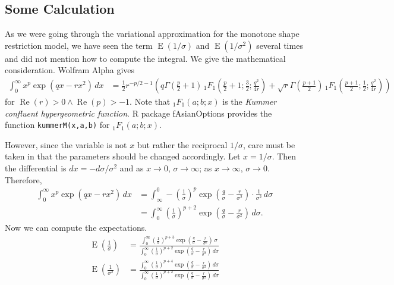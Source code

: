 \documentclass[11pt]{article}
\newcommand{\opn}{\operatorname}
\begin{document}
\subsection{Some Calculation}
As we were going through the variational approximation for the monotone shape restriction model, we have seen the term $\opn{E}\left(1/\sigma\right)$ and $\opn{E}\left(1/\sigma^{2}\right)$ several times and did not mention how to compute the integral. We give the mathematical consideration. Wolfram Alpha gives
\begin{align*}
  \int_{0}^{\infty}x^{p}\exp\left(qx-rx^{2}\right)\,dx &= \frac{1}{2}r^{-p/2 -1}\left(q\Gamma\left(\frac{p}{2}+1\right)\, _{1}{F}_{1}\left(\frac{p}{2}+1;\frac{3}{2};\frac{q^{2}}{4r}\right)+\sqrt{r}\Gamma\left(\frac{p+1}{2}\right)\, _{1}{F}_{1}\left(\frac{p+1}{2};\frac{1}{2};\frac{q^{2}}{4r}\right)\right)
\end{align*}
for $\opn{Re}\left(r\right)>0 \wedge \opn{Re}\left(p\right) > -1$. Note that $_{1}F_{1}\left(a;b;x\right)$ is the \emph{Kummer confluent hypergeometric function}. \textsf{R} package \textsf{fAsianOptions} provides the function \texttt{kummerM(x,a,b)} for $_{1}F_{1}\left(a;b;x\right)$. \par
However, since the variable is not $x$ but rather the reciprocal $1/\sigma$, care must be taken in that the parameters should be changed accordingly. Let $x=1/\sigma$. Then the differential is $dx = -d\sigma/\sigma^{2}$ and as $x\to 0$, $\sigma \to \infty$; as $x \to \infty$, $\sigma \to 0$. Therefore,
\begin{align*}
  \int_{0}^{\infty}x^{p}\exp\left(qx-rx^{2}\right)\,dx &= \int_{\infty}^{0} -\left(\frac{1}{\sigma}\right)^{p}\exp\left(\frac{q}{\sigma}-\frac{r}{\sigma^{2}}\right)\cdot \frac{1}{\sigma^{2}}\,d\sigma\\
  &= \int_{0}^{\infty} \left(\frac{1}{\sigma}\right)^{p+2}\exp\left(\frac{q}{\sigma}-\frac{r}{\sigma^{2}}\right)\,d\sigma.
\end{align*}
Now we can compute the expectations.
\begin{align*}
  \opn{E}\left(\frac{1}{\sigma}\right) &= \frac{\int_{0}^{\infty}\left(\frac{1}{\sigma}\right)^{p+3}\exp\left(\frac{q}{\sigma}-\frac{r}{\sigma^{2}}\right)\,\sigma}{\int_{0}^{\infty} \left(\frac{1}{\sigma}\right)^{p+2}\exp\left(\frac{q}{\sigma}-\frac{r}{\sigma^{2}}\right)\,d\sigma}\\
  \opn{E}\left(\frac{1}{\sigma^{2}}\right) &= \frac{\int_{0}^{\infty}\left(\frac{1}{\sigma}\right)^{p+4}\exp\left(\frac{q}{\sigma}-\frac{r}{\sigma^{2}}\right)\,d\sigma}{\int_{0}^{\infty} \left(\frac{1}{\sigma}\right)^{p+2}\exp\left(\frac{q}{\sigma}-\frac{r}{\sigma^{2}}\right)\,d\sigma}
\end{align*}
\end{document}
